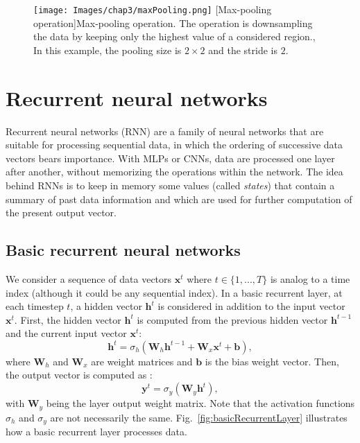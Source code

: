 \begin{figure}[t]
    \begin{center}
    \texttt{[image: Images/chap3/maxPooling.png]}
    [Max-pooling operation]{Max-pooling operation. The operation is downsampling the data by keeping only the highest value of a considered region., In this example, the pooling size is $2 \times 2$ and the stride is $2$.}
    \label{fig:maxPooling}
    \end{center}
\end{figure}

\section{Recurrent neural networks}
\label{ss:recurrentNeuralNetworks}

Recurrent neural networks (RNN) are a family of neural networks that are suitable for processing sequential data, in which the ordering of successive data vectors bears importance. With MLPs or CNNs, data are processed one layer after another, without memorizing the operations within the network. The idea behind RNNs is to keep in memory some values (called \textit{states}) that contain a summary of past data information and which are used for further computation of the present output vector.

\subsection{Basic recurrent neural networks}

We consider a sequence of data vectors $\mathbf{x}^t$ where $t \in \{1,..., T\}$ is analog to a time index (although it could be any sequential index). In a basic recurrent layer, at each timestep $t$, a hidden vector $\mathbf{h}^t$ is considered in addition to the input vector $\mathbf{x}^t$. First, the hidden vector $\mathbf{h}^t$ is computed from the previous hidden vector $\mathbf{h}^{t-1}$ and the current input vector $\mathbf{x}^t$:
\begin{equation}
    \mathbf{h}^t = \sigma_h(\mathbf{W}_h \mathbf{h}^{t-1} + \mathbf{W}_x \mathbf{x}^t + \mathbf{b}),
\end{equation}
where $\mathbf{W}_h$ and $\mathbf{W}_x$ are weight matrices and $\mathbf{b}$ is the bias weight vector. Then, the output vector is computed as :
\begin{equation}
    \mathbf{y}^t = \sigma_y(\mathbf{W}_y \mathbf{h}^t),
\end{equation}
with $\mathbf{W}_y$ being the layer output weight matrix. Note that the activation functions $\sigma_h$ and $\sigma_y$ are not necessarily the same.
Fig.~\ref{fig:basicRecurrentLayer} illustrates how a basic recurrent layer processes data.


